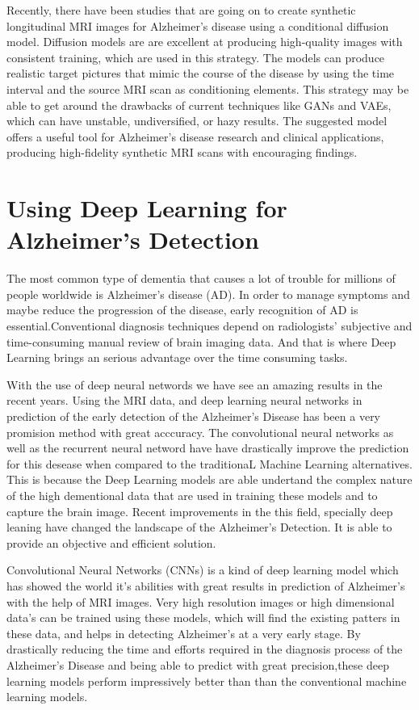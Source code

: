 \documentclass[12pt,onecolumn]{report}
\begin{document}
Recently, there have been studies that are going on to create synthetic longitudinal MRI images for Alzheimer's disease using a conditional diffusion model. Diffusion models are are excellent at producing high-quality images with consistent training, which are used in this strategy. The models can produce realistic target pictures that mimic the course of the disease by using the time interval and the source MRI scan as conditioning elements. This strategy may be able to get around the drawbacks of current techniques like GANs and VAEs, which can have unstable, undiversified, or hazy results. The suggested model offers a useful tool for Alzheimer's disease research and clinical applications, producing high-fidelity synthetic MRI scans with encouraging findings\cite{Duy2024}.


\section{Using Deep Learning for Alzheimer’s Detection}
The most common type of dementia that causes a lot of trouble for  millions of people worldwide is Alzheimer's disease (AD). In order to manage symptoms and maybe reduce the progression of the disease, early recognition of AD is essential\cite{2023ShenLiu}.Conventional diagnosis techniques depend on radiologists' subjective and time-consuming manual review of brain imaging data. And that is where Deep Learning brings an serious advantage over the time consuming tasks.

With the use of deep neural networds we have see an amazing results in the recent years. Using the MRI data, and deep learning neural networks in prediction of the early detection of the Alzheimer’s Disease has been a very promision method with great acccuracy. The convolutional neural networks as well as the recurrent neural netword have have drastically improve the prediction for this desease when compared to the traditionaL Machine Learning alternatives. This is because the Deep Learning models are able undertand the complex nature of the high dementional data that are used in training these models and to capture the brain image\cite{2019Jo}. Recent improvements in the this field, specially deep leaning have changed the landscape of the Alzheimer’s Detection. It is able to provide an objective and efficient solution.

Convolutional Neural Networks (CNNs) is a kind of deep learning model which has showed the world it's abilities with great results in prediction of Alzheimer’s with the help of MRI images. Very high resolution images or high dimensional data's can be trained using these models, which will find the existing patters in these data, and helps in detecting Alzheimer’s at a very early stage. By drastically reducing the time and efforts required in the diagnosis process of the Alzheimer’s Disease and being able to predict with great precision,these deep learning models perform impressively better than than the conventional machine learning models.
\end{document}
